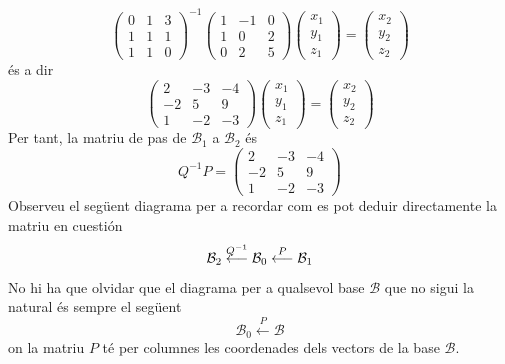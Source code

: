 \begin{solucio}
\begin{equation*}
\left(
\begin{array}{ccc}
0 & 1 & 3 \\
1 & 1 & 1 \\
1 & 1 & 0%
\end{array}%
\right) ^{-1}\left(
\begin{array}{ccc}
1 & -1 & 0 \\
1 & 0 & 2 \\
0 & 2 & 5%
\end{array}%
\right) \left(
\begin{array}{c}
x_{1} \\
y_{1} \\
z_{1}%
\end{array}%
\right) =\left(
\begin{array}{c}
x_{2} \\
y_{2} \\
z_{2}%
\end{array}%
\right)
\end{equation*}%
és a dir%
\begin{equation*}
\left(
\begin{array}{ccc}
2 & -3 & -4 \\
-2 & 5 & 9 \\
1 & -2 & -3%
\end{array}%
\right) \left(
\begin{array}{c}
x_{1} \\
y_{1} \\
z_{1}%
\end{array}%
\right) =\left(
\begin{array}{c}
x_{2} \\
y_{2} \\
z_{2}%
\end{array}%
\right)
\end{equation*}%
Per tant, la matriu de pas de $\mathcal{B}_{1}$ a $\mathcal{B}_{2}$ és%
\begin{equation*}
Q^{-1}P=\left(
\begin{array}{ccc}
2 & -3 & -4 \\
-2 & 5 & 9 \\
1 & -2 & -3%
\end{array}%
\right)
\end{equation*}%
Observeu el següent diagrama per a recordar com es pot deduir
directamente la matriu en cuestión%
\begin{equation*}
\mathcal{B}_{2}\overset{Q^{-1}}{\longleftarrow }\mathcal{B}_{0}\overset{P}{%
\longleftarrow }\mathcal{B}_{1}
\end{equation*}%
No hi ha que olvidar que el diagrama per a qualsevol base $\mathcal{B}$ que no
sigui la natural és sempre el següent%
\begin{equation*}
\mathcal{B}_{0}\overset{P}{\longleftarrow }\mathcal{B}
\end{equation*}%
on la matriu $P$ té per columnes les coordenades dels vectors de
la base $\mathcal{B}$.
\end{solucio}